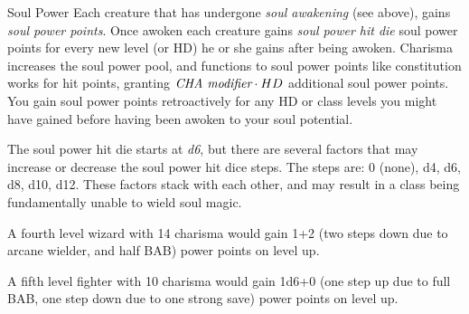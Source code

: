 \begin{35e}{Soul Power}
  Each creature that has undergone \emph{soul awakening} (see above), gains
  \emph{soul power points}. Once awoken each creature gains \emph{soul power
    hit die} soul power points for every new level (or HD) he or she gains after
  being awoken. Charisma increases the soul power pool, and functions to soul
  power points like constitution works for hit points, granting
  $ \emph{CHA modifier} \cdot HD $ additional soul power points. You gain soul
  power points retroactively for any HD or class levels you might have gained
  before having been awoken to your soul potential.

  The soul power hit die starts at \emph{d6}, but there are several factors
  that may increase or decrease the soul power hit dice steps. The steps are:
  0 (none), d4, d6, d8, d10, d12. These factors stack with each other, and may
  result in a class being fundamentally unable to wield soul magic.

  A fourth level wizard with 14 charisma would gain 1+2 (two steps down due to
  arcane wielder, and half BAB) power points on level up.

  A fifth level fighter with 10 charisma would gain 1d6+0 (one step up due to
  full BAB, one step down due to one strong save) power points on level up.
\end{35e}

